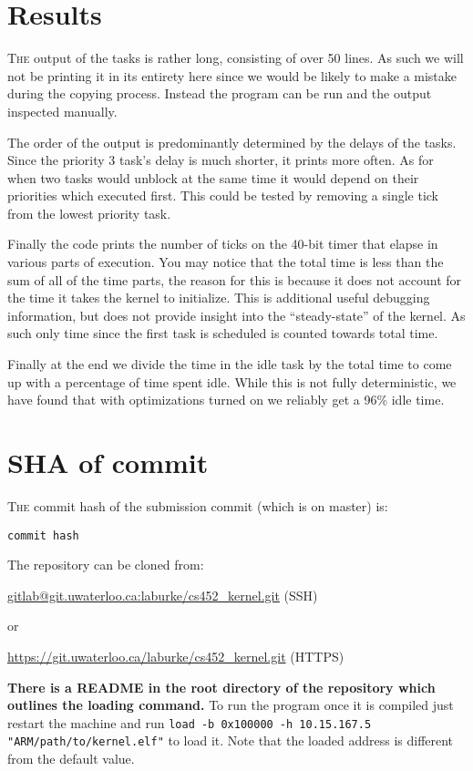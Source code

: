 \documentclass{article}
\begin{document}
\section*{Results}

\textsc{The} output of the tasks is rather long, consisting of over 50 lines. As
such we will not be printing it in its entirety here since we would be likely to
make a mistake during the copying process. Instead the program can be run and
the output inspected manually.

The order of the output is predominantly determined by the delays of the tasks.
Since the priority 3 task's delay is much shorter, it prints more often. As for
when two tasks would unblock at the same time it would depend on their
priorities which executed first. This could be tested by removing a single tick
from the lowest priority task.

Finally the code prints the number of ticks on the 40-bit timer that elapse in
various parts of execution. You may notice that the total time is less than the
sum of all of the time parts, the reason for this is because it does not account
for the time it takes the kernel to initialize. This is additional useful
debugging information, but does not provide insight into the ``steady-state'' of
the kernel. As such only time since the first task is scheduled is counted
towards total time.

Finally at the end we divide the time in the idle task by the total time to come
up with a percentage of time spent idle. While this is not fully deterministic,
we have found that with optimizations turned on we reliably get a 96\% idle
time.

\section*{SHA of commit}

\textsc{The} commit hash of the submission commit (which is on master) is:

\texttt{{{{commit hash}}}}

\noindent The repository can be cloned from:

\url{gitlab@git.uwaterloo.ca:laburke/cs452_kernel.git} (SSH)

or

\url{https://git.uwaterloo.ca/laburke/cs452_kernel.git} (HTTPS)

\textbf{There is a README in the root directory of the repository which outlines
the loading command.} To run the program once it is compiled just restart the
machine and run \texttt{load -b 0x100000 -h 10.15.167.5
"ARM/path/to/kernel.elf"} to load it. Note that the loaded address is different
from the default value.
\end{document}
